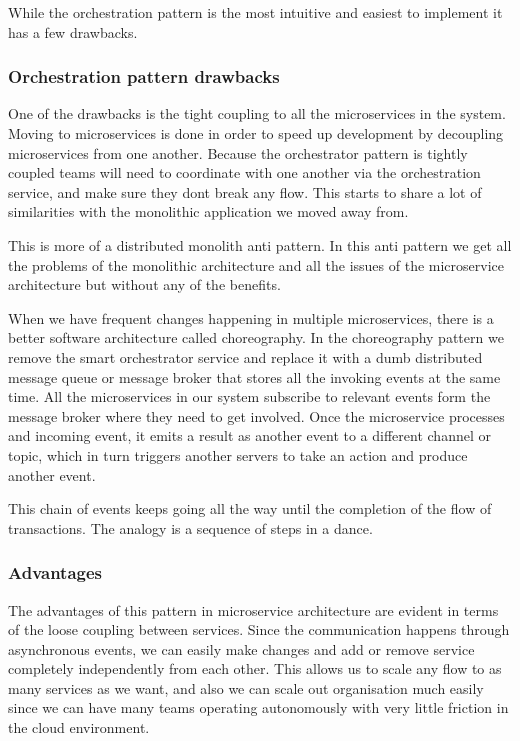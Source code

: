 While the orchestration pattern is the most intuitive and easiest to implement it has a few drawbacks.

\subsubsection{Orchestration pattern drawbacks}
One of the drawbacks is the tight coupling to all the microservices in the system.
Moving to microservices is done in order to speed up development by decoupling microservices from one another.
Because the orchestrator pattern is tightly coupled teams will need to coordinate with one another via the orchestration service, and make sure they dont break any flow.
This starts to share a lot of similarities with the monolithic application we moved away from.

\begin{note}
    This is more of a distributed monolith anti pattern.
    In this anti pattern we get all the problems of the monolithic architecture and all the issues of the microservice architecture but without any of the benefits.
\end{note}

When we have frequent changes happening in multiple microservices, there is a better software architecture called choreography.
In the choreography pattern we remove the smart orchestrator service and replace it with a dumb distributed message queue or message broker that stores all the invoking events at the same time.
All the microservices in our system subscribe to relevant events form the message broker where they need to get involved.
Once the microservice processes and incoming event, it emits a result as another event to a different channel or topic, which in turn triggers another servers to take an action and produce another event.

This chain of events keeps going all the way until the completion of the flow of transactions.
The analogy is a sequence of steps in a dance.

\subsubsection{Advantages}
The advantages of this pattern in microservice architecture are evident in terms of the loose coupling between services.
Since the communication happens through asynchronous events, we can easily make changes and add or remove service completely independently from each other.
This allows us to scale any flow to as many services as we want, and also we can scale out organisation much easily since we can have many teams operating autonomously with very little friction in the cloud environment.


